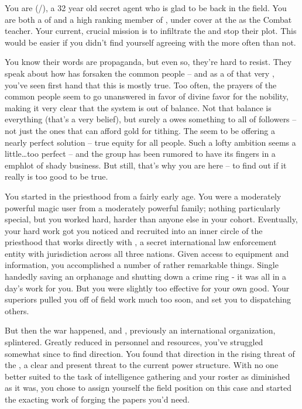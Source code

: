 \documentclass[char]{GL2020}
\begin{document}
\name{\cInterpol{}}

You are \cInterpol{} (\cInterpol{\they}/\cInterpol{\them}), a 32 year old secret agent who is glad to be back in the field. You are both a \cInterpol{\cleric} of \cFarmGod{} and a high ranking member of \pInterpol{}, under cover at the \pSchool{} as the Combat teacher. Your current, crucial mission is to infiltrate the \pGoaties{} and stop their plot. This would be easier if you didn’t find yourself agreeing with the \pGoaties{} more often than not.

You know their words are propaganda, but even so, they’re hard to resist. They speak about how \cFarmGod{} has forsaken the common people -- and as a \cInterpol{\cleric} of that very \cFarmGod{\God}, you’ve seen first hand that this is mostly true. Too often, the prayers of the common people seem to go unanswered in favor of divine favor for the nobility, making it very clear that the system is out of balance. Not that balance is everything (that’s a very \pShip{} belief), but surely a \cFarmGod{\God} owes something to all of \cFarmGod{\their} followers -- not just the ones that can afford gold for tithing. The \pGoaties{} seem to be offering a nearly perfect solution -- true equity for all people. Such a lofty ambition seems a little\dots too perfect -- and the group has been rumored to have its fingers in a emph{lot} of shady business. But still, that’s why you are here -- to find out if it really is too good to be true. 

You started in the priesthood from a fairly early age. You were a moderately powerful magic user from a moderately powerful family; nothing particularly special, but you worked hard, harder than anyone else in your cohort. Eventually, your hard work got you noticed and recruited into an inner circle of the priesthood that works directly with \pInterpol{}, a secret international law enforcement entity with jurisdiction across all three nations. Given access to equipment and information, you accomplished a number of rather remarkable things. Single handedly saving an orphanage and shutting down a crime ring - it was all in a day's work for you. But you were slightly too effective for your own good. Your superiors pulled you off of field work much too soon, and set you to dispatching others.

But then the war happened, and \pInterpol{}, previously an international organization, splintered. Greatly reduced in personnel and resources, you’ve struggled somewhat since to find direction. You found that direction in the rising threat of the \pGoaties{}, a clear and present threat to the current power structure. With no one better suited to the task of intelligence gathering and your roster as diminished as it was, you chose to assign yourself the field position on this case and started the exacting work of forging the papers you’d need.
\end{document}
